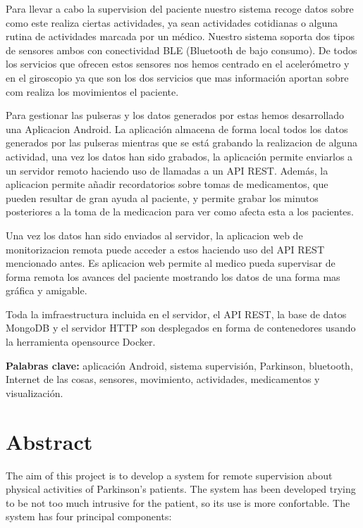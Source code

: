 Para llevar a cabo la supervision del paciente nuestro sistema recoge datos sobre como este realiza ciertas actividades, ya sean actividades cotidianas o alguna rutina de actividades marcada por un médico. Nuestro sistema soporta dos tipos de sensores ambos con conectividad BLE (Bluetooth de bajo consumo). De todos los servicios que ofrecen estos sensores nos hemos centrado en el acelerómetro y en el giroscopio ya que son los dos servicios que mas información aportan sobre com realiza los movimientos el paciente.
\newline

Para gestionar las pulseras y los datos generados por estas hemos desarrollado una Aplicacion Android. La aplicación almacena de forma local todos los datos generados por las pulseras mientras que se está grabando la realizacion de alguna actividad, una vez los datos han sido grabados, la aplicación permite enviarlos a un servidor remoto haciendo uso de llamadas a un API REST. Además, la aplicacion permite añadir recordatorios sobre tomas de medicamentos, que pueden resultar de gran ayuda al paciente, y permite grabar los minutos posteriores a la toma de la medicacion para ver como afecta esta a los pacientes.
\newline

Una vez los datos han sido enviados al servidor, la aplicacion web de monitorizacion remota puede acceder a estos haciendo uso del API REST mencionado antes. Es aplicacion web permite al medico pueda supervisar de forma remota los avances del paciente mostrando los datos de una forma mas gráfica y amigable.
\newline

Toda la imfraestructura incluida en el servidor, el API REST, la base de datos MongoDB y el servidor HTTP son desplegados en forma de contenedores usando la herramienta opensource Docker.
\newline

{\bf Palabras clave:} aplicación Android, sistema supervisión, Parkinson, bluetooth, Internet de las cosas, sensores, movimiento, actividades, medicamentos y visualización.
\newpage

\blankpage

\section*{Abstract}
The aim of this project is to develop a system for remote supervision about physical activities of Parkinson's patients. The system has been developed trying to be not too much intrusive for the patient, so its use is more confortable. The system has four principal components:

